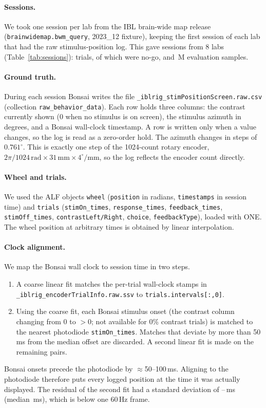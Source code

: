 \documentclass[11pt,a4paper]{article}
\begin{document}
\paragraph{Sessions.} We took one session per lab from the IBL brain-wide map release
(\texttt{brainwidemap.bwm\_query}, 2023\_12 fixture), keeping the first session of each lab that had the raw
stimulus-position log. This gave \NSessions{} sessions from 8 labs (Table~\ref{tab:sessions}): \NTrials{} trials,
of which \NNogo{} were no-go, and \NSamples\,M evaluation samples.

\paragraph{Ground truth.} During each session Bonsai writes the file \texttt{\_iblrig\_stimPositionScreen.raw.csv} (collection \texttt{raw\_behavior\_data}).
Each row holds three columns: the contrast currently shown (0 when no stimulus is on screen), the stimulus
azimuth in degrees, and a Bonsai wall-clock timestamp. A row is written only when a value changes, so the log
is read as a zero-order hold. The azimuth changes in steps of $0.761^\circ$. This is exactly one step of the
1024-count rotary encoder, $2\pi/1024\,\mathrm{rad}\times 31\,\mathrm{mm}\times 4^\circ/\mathrm{mm}$, so the log
reflects the encoder count directly.

\paragraph{Wheel and trials.} We used the ALF objects \texttt{wheel} (\texttt{position} in radians,
\texttt{timestamps} in session time) and \texttt{trials} (\texttt{stimOn\_times}, \texttt{response\_times},
\texttt{feedback\_times}, \texttt{stimOff\_times}, \texttt{contrastLeft/Right}, \texttt{choice},
\texttt{feedbackType}), loaded with ONE. The wheel position at arbitrary times is obtained by linear interpolation.

\paragraph{Clock alignment.} We map the Bonsai wall clock to session time in two steps.
\begin{enumerate}
\item A coarse linear fit matches the per-trial wall-clock stamps in
\texttt{\_iblrig\_encoderTrialInfo.raw.ssv} to \texttt{trials.intervals[:,0]}.
\item Using the coarse fit, each Bonsai stimulus onset (the contrast column changing from 0 to $>0$; not
available for 0\% contrast trials) is matched to the nearest photodiode \texttt{stimOn\_times}. Matches that
deviate by more than 50\,ms from the median offset are discarded. A second linear fit is made on the remaining
pairs.
\end{enumerate}
Bonsai onsets precede the photodiode by $\approx$50--100\,ms. Aligning to the photodiode therefore puts every
logged position at the time it was actually displayed. The residual of the second fit had a standard deviation
of \AlignSDmin--\AlignSDmax\,ms (median \AlignSD\,ms), which is below one 60\,Hz frame.
\end{document}
